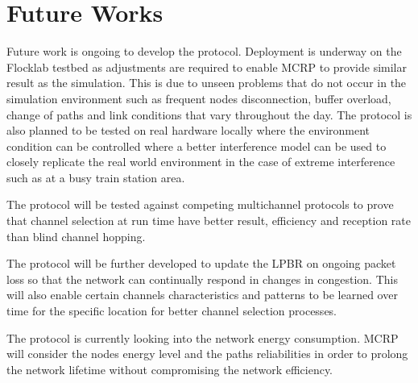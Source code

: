 \section{Future Works}
Future work is ongoing to develop the protocol. 
Deployment is underway on the Flocklab testbed as adjustments are required to enable MCRP to provide similar result as the simulation. This is due to unseen problems that do not occur in the simulation environment such as frequent nodes disconnection, buffer overload, change of paths and link conditions that vary throughout the day. The protocol is also planned to be tested on real hardware locally where the environment condition can be controlled where a better interference model can be used to closely replicate the real world environment in the case of extreme interference such as at a busy train station area.

The protocol will be tested against competing multichannel protocols to prove that channel selection at run time have better result, efficiency and reception rate than blind channel hopping.

The protocol will be further developed to update the LPBR on ongoing packet loss so that the network can continually respond in changes in congestion. This will also enable certain channels characteristics and patterns to be learned over time for the specific location for better channel selection processes. 

The protocol is currently looking into the network energy consumption. MCRP will consider the nodes energy level and the paths reliabilities in order to prolong the network lifetime without compromising the network efficiency.

